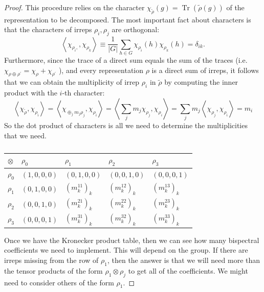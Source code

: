 \documentclass{article}
\begin{document}
\begin{proof}
    This procedure relies on the character $\chi_{\tilde \rho}(g)=\operatorname{Tr}(\tilde \rho(g))$ of the representation to be decomposed. The most important fact about characters is that the characters of irreps $\rho_i, \rho_j$ are orthogonal:
    \begin{equation}
    \left\langle\chi_{\rho_i,}, \chi_{\rho_k}\right\rangle \equiv \frac{1}{|G|} \sum_{h \in G} \chi_{\rho_i}(h) \chi_{\rho_k}(h)=\delta_{i k} .
    \end{equation}
    Furthermore, since the trace of a direct sum equals the sum of the traces (i.e. $\chi_{\rho \oplus \rho^{\prime}}=\chi_\rho+\chi_{\rho^{\prime}}$ ), and every representation $\rho$ is a direct sum of irreps, it follows that we can obtain the multiplicity of
    irrep $\rho_i$ in $\tilde \rho$ by computing the inner product with the $i$-th character:
    $$
    \left\langle\chi_{\tilde \rho}, \chi_{\rho_i}\right\rangle
    =
    \left\langle\chi_{\oplus_j m_j \rho_j}, \chi_{\rho_i}\right\rangle=\left\langle\sum_j m_j \chi_{\rho_j}, \chi_{\rho_i}\right\rangle
    =
    \sum_j m_j\left\langle\chi_{\rho_j}, \chi_{\rho_i}\right\rangle
    =m_i
    $$
    So the dot product of characters is all we need to determine the multiplicities that we need.


    \begin{table}[]
    \centering
    \begin{tabular}{|l|l|l|l|l|}
    \hline
    $\otimes$ & $\rho_0$       & $\rho_1$       & $\rho_2$       & $\rho_3$       \\ \hline
    $\rho_0$  & $(1, 0, 0, 0)$ & $(0, 1, 0, 0)$ & $(0, 0, 1, 0)$ & $(0, 0, 0, 1)$ \\ \hline
    $\rho_1$  & $(0, 1, 0, 0)$ & $(m_k^{11})_k$ & $(m_k^{12})_k$ & $(m_k^{13})_k$ \\ \hline
    $\rho_2$  & $(0, 0, 1, 0)$ & $(m_k^{21})_k$ & $(m_k^{22})_k$ & $(m_k^{23})_k$ \\ \hline
    $\rho_3$  & $(0, 0, 0, 1)$ & $(m_k^{31})_k$ & $(m_k^{32})_k$ & $(m_k^{33})_k$ \\ \hline
    \end{tabular}
    \caption{}
    \label{tab:my-table}
    \end{table}

    Once we have the Kronecker product table, then we can see how many bispectral coefficients we need to implement. This will depend on the group. If there are irreps missing from the row of $\rho_1$, then the answer is that we will need more than the tensor products of the form $\rho_1 \otimes \rho_j$ to get all of the coefficients. We might need to consider others of the form $\rho_1$.


\end{proof}
\end{document}
